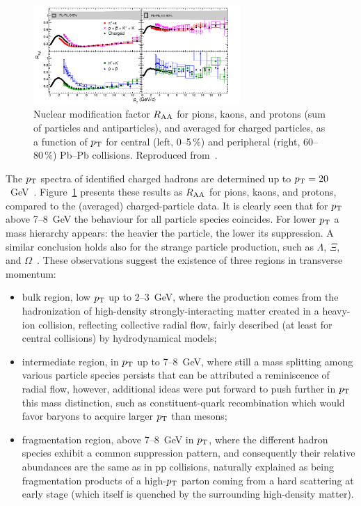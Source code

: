 \begin{figure}
\centering
\includegraphics[width=0.7\textwidth]{particlefigs/IdentHighPtRAA.pdf}
\caption{Nuclear modification factor $R_{\rm AA}$ for pions, kaons, and protons (sum of particles and antiparticles), and averaged for charged particles, as a function of $p_{\rm T}$ for central (left, 0--5\,\%) and peripheral (right, 60--80\,\%) Pb--Pb collisions. Reproduced from~\cite{ALICEIdentHighPtRAA}.}
\label{figks:IdentPartRAA}
\end{figure}

The $p_{\rm T}$ spectra of identified charged hadrons are determined up to $p_{\rm T} = 20$~GeV~\cite{ALICEIdentHighPtRAA}. Figure~\ref{figks:IdentPartRAA} presents these results as $R_{\rm AA}$ for pions, kaons, and protons, compared to the (averaged) charged-particle data. It is clearly seen that for $p_{\rm T}$ above 7--8~GeV the behaviour for all particle species coincides. For lower $p_{\rm T}$ a mass hierarchy appears: the heavier the particle, the lower its suppression. A similar conclusion holds also for the strange particle production, such as $\Lambda$, $\Xi$, and $\Omega$~\cite{ABELEV:2013zaa,Abelev:2013xaa}. These observations suggest the existence of three regions in transverse momentum:
\begin{itemize}
    \item{bulk region, low $p_{\rm T}$ up to 2--3~GeV, where the production comes from the hadronization of high-density strongly-interacting matter created in a heavy-ion collision, reflecting collective radial flow, fairly described (at least for central collisions) by hydrodynamical models;}
    \item{intermediate region, in $p_{\rm T}$ up to 7--8~GeV, where still a mass splitting among various particle species persists that can be attributed a reminiscence of radial flow, however, additional ideas were put forward to push further in $p_{\rm T}$ this mass distinction, such as constituent-quark recombination which would favor baryons to acquire larger $p_{\rm T}$ than mesons;}
    \item{fragmentation region, above 7--8~GeV in $p_{\rm T}$, where the different hadron species exhibit a common suppression pattern, and consequently their relative abundances are the same as in pp collisions, naturally explained as being fragmentation products of a high-$p_{\rm T}$ parton coming from a hard scattering at early stage (which itself is quenched by the surrounding high-density matter).}
\end{itemize}

